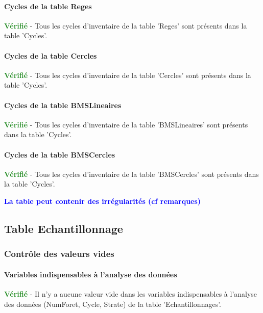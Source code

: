 \documentclass[a4paper]{article}
\begin{document}
\paragraph{Cycles de la table Reges}
\textcolor{ForestGreen}{\textbf{Vérifié}} - Tous les cycles d'inventaire de la table 'Reges' sont présents dans la table 'Cycles'. \\ 

\paragraph{Cycles de la table Cercles}
\textcolor{ForestGreen}{\textbf{Vérifié}} - Tous les cycles d'inventaire de la table 'Cercles' sont présents dans la table 'Cycles'. \\ 

\paragraph{Cycles de la table BMSLineaires}
\textcolor{ForestGreen}{\textbf{Vérifié}} - Tous les cycles d'inventaire de la table 'BMSLineaires' sont présents dans la table 'Cycles'. \\ 

\paragraph{Cycles de la table BMSCercles}
\textcolor{ForestGreen}{\textbf{Vérifié}} - Tous les cycles d'inventaire de la table 'BMSCercles' sont présents dans la table 'Cycles'. \\ 

\begin{center}
\textcolor{Blue}{\textbf{La table peut contenir des irrégularités (cf remarques)}}
\end{center}


\FloatBarrier

\subsection{Table Echantillonnage}
\subsubsection{Contrôle des valeurs vides}
\paragraph{Variables indispensables à l'analyse des données}
\textcolor{ForestGreen}{\textbf{Vérifié}} - Il n'y a aucune valeur vide dans les variables indispensables à l'analyse des données (NumForet, Cycle, Strate) de la table 'Echantillonnages'. \\ 
\end{document}
